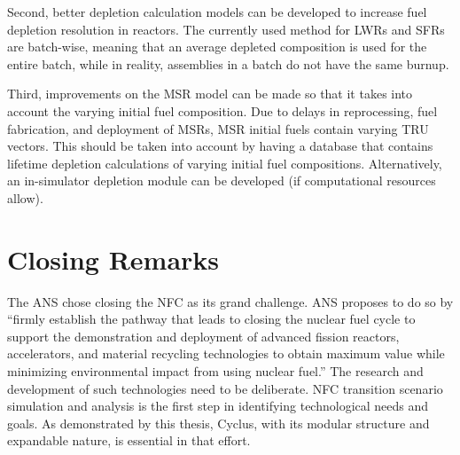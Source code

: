 Second, better depletion calculation models can be developed to increase
fuel depletion resolution in reactors. The currently used method for
\glspl{LWR} and \glspl{SFR} are batch-wise, meaning that an average
depleted composition is used for the entire batch, while in reality,
assemblies in a batch do not have the same burnup.

Third, improvements on the \gls{MSR} model can be made so that it
takes into account the varying initial fuel composition. Due to delays
in reprocessing, fuel fabrication, and deployment of \glspl{MSR}, \gls{MSR}
initial fuels contain varying \gls{TRU} vectors. This should be taken into
account by having a database that contains lifetime depletion calculations
of varying initial fuel compositions. Alternatively, an in-simulator
depletion module can be developed (if computational resources allow).


\section{Closing Remarks}
The \gls{ANS} chose closing the \gls{NFC} as its grand challenge. \gls{ANS}
proposes to do so by ``firmly establish the pathway that leads to closing
the nuclear fuel cycle to support the demonstration and deployment of
advanced fission reactors, accelerators, and material recycling technologies
to obtain maximum value while minimizing environmental impact 
from using nuclear fuel.'' The research and development of such technologies
need to be deliberate. \gls{NFC} transition scenario simulation and 
analysis is the first step in identifying technological needs
and goals.  As demonstrated by this thesis, Cyclus, with its
modular structure and expandable nature, is essential in that effort.

